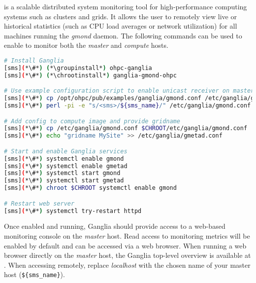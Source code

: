 \Ganglia{} is a scalable distributed system monitoring tool for high-performance
computing systems such as clusters and grids. It allows the user to remotely
view live or historical statistics (such as CPU load averages or network
utilization) for all machines running the {\em gmond} daemon. The following 
commands can be used to enable \Ganglia{} to monitor both the {\em master} and 
{\em compute} hosts.

\begin{lstlisting}[language=bash,keywords={},upquote=true]
# Install Ganglia
[sms](*\#*) (*\groupinstall*) ohpc-ganglia
[sms](*\#*) (*\chrootinstall*) ganglia-gmond-ohpc

# Use example configuration script to enable unicast receiver on master host
[sms](*\#*) cp /opt/ohpc/pub/examples/ganglia/gmond.conf /etc/ganglia/gmond.conf
[sms](*\#*) perl -pi -e "s/<sms>/${sms_name}/" /etc/ganglia/gmond.conf

# Add config to compute image and provide gridname 
[sms](*\#*) cp /etc/ganglia/gmond.conf $CHROOT/etc/ganglia/gmond.conf
[sms](*\#*) echo "gridname MySite" >> /etc/ganglia/gmetad.conf

# Start and enable Ganglia services
[sms](*\#*) systemctl enable gmond
[sms](*\#*) systemctl enable gmetad
[sms](*\#*) systemctl start gmond
[sms](*\#*) systemctl start gmetad
[sms](*\#*) chroot $CHROOT systemctl enable gmond

# Restart web server
[sms](*\#*) systemctl try-restart httpd
\end{lstlisting}

\noindent Once enabled and running, Ganglia should provide access to a web-based
monitoring console on the {\em master} host. Read access to monitoring metrics
will be enabled by default and can be accessed via a web browser. When running
a web browser directly on the {\em master} host, the Ganglia top-level overview
is available
at \href{http://localhost/ganglia}{\color{blue}{http://localhost/ganglia}}.
When accessing remotely, replace {\em localhost} with the chosen name of your
master host (\texttt{\$\{sms\_name\}}).


